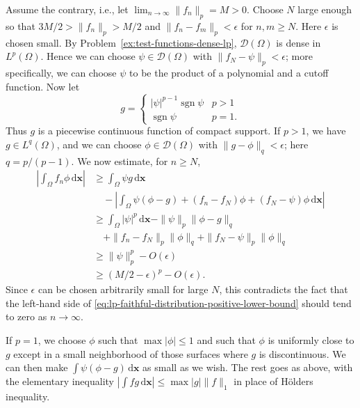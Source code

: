 \begin{Proof}
Assume the contrary, i.e., let $\lim_{n\to\infty}\|f_n\|_p=M>0$. Choose $N$ large enough so that $3M/2>\|f_n\|_p>M/2$ and $\|f_n-f_m\|_p<\epsilon$ for $n,m\geq N$. Here $\epsilon$ is chosen small. By Problem~\ref{ex:test-functions-dense-lp}, $\mathcal{D}(\Omega)$ is dense in $L^p(\Omega)$. Hence we can choose $\psi\in\mathcal{D}(\Omega)$ with $\|f_N-\psi\|_p<\epsilon$; more specifically, we can choose $\psi$ to be the product of a polynomial and a cutoff function. Now let
\begin{equation}\label{eq:lp-faithful-distribution-dual-test-function}
g=\begin{cases}|\psi|^{p-1}\operatorname{sgn}\psi&p>1\\\operatorname{sgn}\psi&p=1.\end{cases}
\end{equation}
Thus $g$ is a piecewise continuous function of compact support. If $p>1$, we have $g\in L^q(\Omega)$, and we can choose $\phi\in\mathcal{D}(\Omega)$ with $\|g-\phi\|_q<\epsilon$; here $q=p/(p-1)$. We now estimate, for $n\geq N$,
\begin{equation}\label{eq:lp-faithful-distribution-positive-lower-bound}
\begin{aligned}
\left|\int_\Omega f_n\phi\,\mathrm{d}\bm{x}\right|
&\geq\int_\Omega\psi g\,\mathrm{d}\bm{x}\\
&\quad-\left|\int_\Omega\psi(\phi-g)+(f_n-f_N)\phi+(f_N-\psi)\phi\,\mathrm{d}\bm{x}\right|\\
&\geq\int_\Omega|\psi|^p\,\mathrm{d}\bm{x}-\|\psi\|_p\|\phi-g\|_q\\
&\quad+\|f_n-f_N\|_p\|\phi\|_q+\|f_N-\psi\|_p\|\phi\|_q\\
&\geq\|\psi\|_p^p-O(\epsilon)\\
&\geq(M/2-\epsilon)^p-O(\epsilon).
\end{aligned}
\end{equation}
Since $\epsilon$ can be chosen arbitrarily small for large $N$, this contradicts the fact that the left-hand side of \eqref{eq:lp-faithful-distribution-positive-lower-bound} should tend to zero as $n\to\infty$.

If $p=1$, we choose $\phi$ such that $\max|\phi|\leq1$ and such that $\phi$ is uniformly close to $g$ except in a small neighborhood of those surfaces where $g$ is discontinuous. We can then make $\int\psi(\phi-g)\,\mathrm{d}\bm{x}$ as small as we wish. The rest goes as above, with the elementary inequality $|\int fg\,\mathrm{d}\bm{x}|\leq\max|g|\|f\|_1$ in place of Hölder\textquotesingle s inequality.
\end{Proof}

